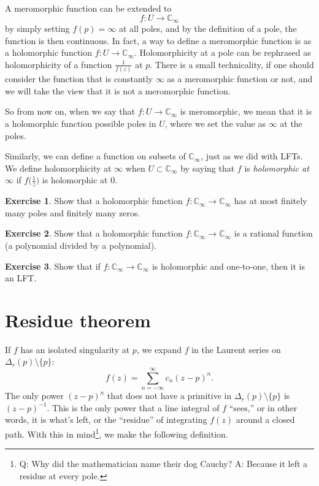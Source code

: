 \documentclass[12pt,openany]{book}
\newcommand{\C}{{\mathbb{C}}}
\newcommand{\myindex}[1]{#1\index{#1}}
\theoremstyle{plain}
\theoremstyle{remark}
\theoremstyle{definition}
\newenvironment{exbox}{%
    \def\FrameCommand{\vrule width 1pt \relax\hspace{10pt}}%
    \MakeFramed{\advance\hsize-\width\FrameRestore}%
}{%
    \endMakeFramed
}
\theoremstyle{exercise}
\newtheorem{exercise}{Exercise}[section]
\theoremstyle{example}
\begin{document}
A meromorphic function can be extended to
\begin{equation*}
f \colon U \to \C_{\infty}
\end{equation*}
by simply setting $f(p) = \infty$ at all poles, and by the definition of a
pole, the function is then continuous.  In fact, a way to define
a meromorphic function is as a holomorphic function
$f \colon U \to \C_{\infty}$.  Holomorphicity at a pole can be
rephrased as holomorphicity of a function $\frac{1}{f(z)}$ at $p$.
There is a small technicality, if one should consider the function
that is constantly $\infty$ as a meromorphic function or not, and we
will take the view that it is not a meromorphic function.

So from now on, when we say that $f \colon U \to \C_\infty$ is
meromorphic, we mean that it is a holomorphic function possible
poles in $U$, where we set the value as $\infty$ at the poles.

Similarly, we can define a function on subsets of $\C_\infty$, just as
we did with LFTs.
We define holomorphicity at $\infty$ when $U \subset
\C_\infty$ by saying that $f$ is \emph{\myindex{holomorphic at $\infty$}}
if $f\bigl(\frac{1}{z}\bigr)$ is holomorphic at $0$.

\begin{exbox}
\begin{exercise}
Show that a holomorphic function $f \colon \C_\infty \to \C_\infty$ has
at most finitely many poles and finitely many zeros.
\end{exercise}

\begin{exercise}
Show that a holomorphic function $f \colon \C_\infty \to \C_\infty$ is a
rational function (a polynomial divided by a polynomial).
\end{exercise}

\begin{exercise}
Show that if $f \colon \C_\infty \to \C_\infty$ is holomorphic and
one-to-one, then it is an LFT.
\end{exercise}
\end{exbox}


\section{Residue theorem}

If $f$ has an isolated singularity at $p$,
we expand
$f$ in the Laurent series on $\Delta_r(p) \setminus \{ p \}$:
\begin{equation*}
f(z) = \sum_{n=-\infty}^\infty c_n {(z-p)}^n .
\end{equation*}
The only power ${(z-p)}^n$ that does not have a primitive in
$\Delta_r(p) \setminus \{ p \}$ is ${(z-p)}^{-1}$.  This is the only power
that a line integral of $f$ ``sees,'' or in other words, it is
what's left, or the ``residue'' of integrating $f(z)$ around a closed path.
With this in mind\footnote{%
Q: Why did the mathematician name their dog Cauchy?
A: Because it left a residue at every pole.},
we make the following definition.
\end{document}
